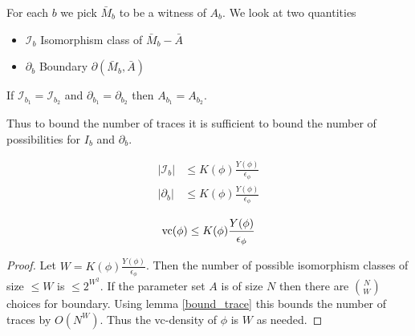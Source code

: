 \documentclass{amsart}
\newcommand{\II}{\mathscr I}
\begin{document}
For each $b$ we pick $\bar M_b$ to be a witness of $A_b$. We look at two quantities
\begin{itemize}
	\item $\II_b$ Isomorphism class of $\bar M_b - \bar A$
	\item $\partial_b$ Boundary $\partial(\bar M_b, \bar A)$
\end{itemize}

\begin{Lemma} \label {bound_trace}
	If $\II_{b_1} = \II_{b_2}$ and $\partial_{b_1} = \partial_{b_2}$ then $A_{b_1} = A_{b_2}$.
\end{Lemma}

Thus to bound the number of traces it is sufficient to bound the number of possibilities for $I_b$ and $\partial_b$.

\begin{Theorem} \label{main_bound}
	\begin{align*}
		|\II_b| &\leq K(\phi) \frac{Y(\phi)}{\epsilon_\phi}\\
		|\partial_b| &\leq K(\phi) \frac{Y(\phi)}{\epsilon_\phi}
	\end{align*}
\end{Theorem}

\begin{Corollary}
	\begin{align*}
		\operatorname{vc}(\phi) \leq K(\phi) \frac{Y(\phi)}{\epsilon_\phi}
	\end{align*}
\end{Corollary}

\begin{proof}
		Let $W = K(\phi) \frac{Y(\phi)}{\epsilon_\phi}$.
		Then the number of possible isomorphism classes of size $\leq W$ is $\leq 2^{W^2}$.
		If the parameter set $A$ is of size $N$ then there are $N \choose W$ choices for boundary.
		Using lemma \ref{bound_trace} this bounds the number of traces by $O(N^W)$.
		Thus the vc-density of $\phi$ is $W$ as needed.
\end{proof}
\end{document}
